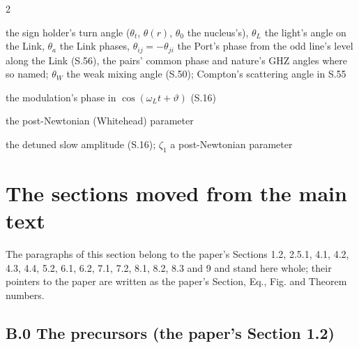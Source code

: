 \documentclass[pdflatex,sn-mathphys-num]{sn-jnl}
\newcommand{\nom}[2]{\item[{#1}] #2}
\theoremstyle{thmstyleone}
\begin{document}
\begin{multicols}{2}
\begin{description}[style=unboxed,leftmargin=0pt,itemsep=0pt,parsep=0pt,font=\normalfont]
\nom{$\theta$}{the sign holder's turn angle ($\theta_t$, $\theta(r)$, $\theta_0$ the nucleus's), $\theta_L$ the light's angle on the Link, $\theta_a$ the Link phases, $\theta_{ij} = -\theta_{ji}$ the Port's phase from the odd line's level along the Link (S.56), the pairs' common phase and nature's GHZ angles where so named; $\theta_W$ the weak mixing angle (S.50); Compton's scattering angle in S.55}
\nom{$\vartheta$}{the modulation's phase in $\cos(\omega_L t + \vartheta)$ (S.16)}
\nom{$\xi$}{the post-Newtonian (Whitehead) parameter}
\nom{$\zeta$}{the detuned slow amplitude (S.16); $\zeta_1$ a post-Newtonian parameter}
\end{description}\end{multicols}

\section*{The sections moved from the main text}\label{sec:moved}

\noindent The paragraphs of this section belong to the paper's Sections 1.2, 2.5.1, 4.1, 4.2, 4.3, 4.4, 5.2, 6.1, 6.2, 7.1, 7.2, 8.1, 8.2, 8.3 and 9 and stand here whole; their pointers to the paper are written as the paper's Section, Eq., Fig. and Theorem numbers.

\subsection*{B.0 The precursors (the paper's Section 1.2)}
\end{document}
